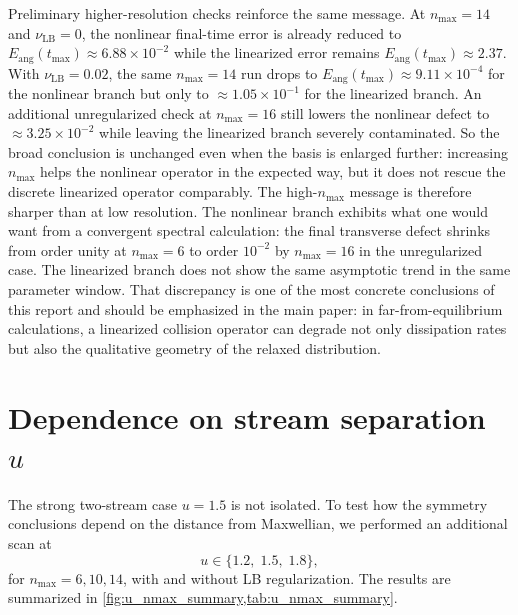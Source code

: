 \documentclass[11pt]{article}
\begin{document}
Preliminary higher-resolution checks reinforce the same message.
At $n_{\max}=14$ and $\nu_{\mathrm{LB}}=0$, the nonlinear final-time error is already reduced to $E_{\mathrm{ang}}(t_{\max})\approx 6.88\times 10^{-2}$ while the linearized error remains $E_{\mathrm{ang}}(t_{\max})\approx 2.37$.
With $\nu_{\mathrm{LB}}=0.02$, the same $n_{\max}=14$ run drops to $E_{\mathrm{ang}}(t_{\max})\approx 9.11\times 10^{-4}$ for the nonlinear branch but only to $\approx 1.05\times 10^{-1}$ for the linearized branch.
An additional unregularized check at $n_{\max}=16$ still lowers the nonlinear defect to $\approx 3.25\times 10^{-2}$ while leaving the linearized branch severely contaminated.
So the broad conclusion is unchanged even when the basis is enlarged further: increasing $n_{\max}$ helps the nonlinear operator in the expected way, but it does not rescue the discrete linearized operator comparably.
The high-$n_{\max}$ message is therefore sharper than at low resolution.
The nonlinear branch exhibits what one would want from a convergent spectral calculation: the final transverse defect shrinks from order unity at $n_{\max}=6$ to order $10^{-2}$ by $n_{\max}=16$ in the unregularized case.
The linearized branch does not show the same asymptotic trend in the same parameter window.
That discrepancy is one of the most concrete conclusions of this report and should be emphasized in the main paper: in far-from-equilibrium calculations, a linearized collision operator can degrade not only dissipation rates but also the qualitative geometry of the relaxed distribution.

\section{Dependence on stream separation $u$}
The strong two-stream case $u=1.5$ is not isolated.
To test how the symmetry conclusions depend on the distance from Maxwellian, we performed an additional scan at
\begin{equation}
u\in\{1.2,\;1.5,\;1.8\},
\end{equation}
for $n_{\max}=6,10,14$, with and without LB regularization.
The results are summarized in \cref{fig:u_nmax_summary,tab:u_nmax_summary}.
\end{document}
